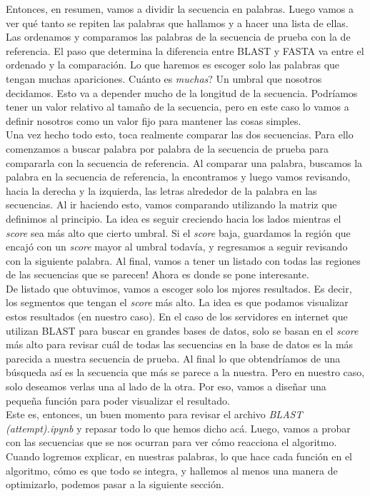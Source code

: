 \documentclass[10pt,letterpaper]{article}
\begin{document}
Entonces, en resumen, vamos a dividir la secuencia en palabras. Luego vamos a ver qu\'e tanto se repiten las palabras que hallamos y a hacer una lista de ellas. Las ordenamos y comparamos las palabras de la secuencia de prueba con la de referencia. El paso que determina la diferencia entre BLAST y FASTA va entre el ordenado y la comparaci\'on. Lo que haremos es escoger solo las palabras que tengan muchas apariciones. Cu\'anto es \emph{muchas}? Un umbral que nosotros decidamos. Esto va a depender mucho de la longitud de la secuencia. Podr\'iamos tener un valor relativo al tama\~no de la secuencia, pero en este caso lo vamos a definir nosotros como un valor fijo para mantener las cosas simples.\\

Una vez hecho todo esto, toca realmente comparar las dos secuencias. Para ello comenzamos a buscar palabra por palabra de la secuencia de prueba para compararla con la secuencia de referencia. Al comparar una palabra, buscamos la palabra en la secuencia de referencia, la encontramos y luego vamos revisando, hacia la derecha y la izquierda, las letras alrededor de la palabra en las secuencias. Al ir haciendo esto, vamos comparando utilizando la matriz que definimos al principio. La idea es seguir creciendo hacia los lados mientras el \emph{score} sea m\'as alto que cierto umbral. Si el \emph{score} baja, guardamos la regi\'on que encaj\'o con un \emph{score} mayor al umbral todav\'ia, y regresamos a seguir revisando con la siguiente palabra. Al final, vamos a tener un listado con todas las regiones de las secuencias que se parecen! Ahora es donde se pone interesante.\\

De listado que obtuvimos, vamos a escoger solo los mjores resultados. Es decir, los segmentos que tengan el \emph{score} m\'as alto. La idea es que podamos visualizar estos resultados (en nuestro caso). En el caso de los servidores en internet que utilizan BLAST para buscar en grandes bases de datos, solo se basan en el \emph{score} m\'as alto para revisar cu\'al de todas las secuencias en la base de datos es la m\'as parecida a nuestra secuencia de prueba. Al final lo que obtendr\'iamos de una b\'usqueda as\'i es la secuencia que m\'as se parece a la nuestra. Pero en nuestro caso, solo deseamos verlas una al lado de la otra. Por eso, vamos a dise\~nar una peque\~na funci\'on para poder visualizar el resultado.\\

Este es, entonces, un buen momento para revisar el archivo \emph{BLAST (attempt).ipynb} y repasar todo lo que hemos dicho ac\'a. Luego, vamos a probar con las secuencias que se nos ocurran para ver c\'omo reacciona el algoritmo. Cuando logremos explicar, en nuestras palabras, lo que hace cada funci\'on en el algoritmo, c\'omo es que todo se integra, y hallemos al menos una manera de optimizarlo, podemos pasar a la siguiente secci\'on.
\end{document}
